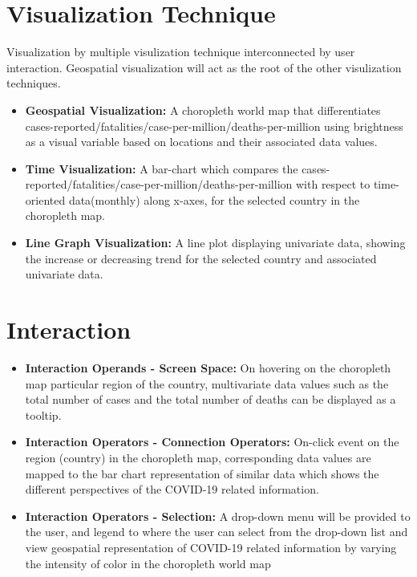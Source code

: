 \documentclass[10pt]{article}
\begin{document}
\section{Visualization Technique}
Visualization by multiple visulization technique interconnected by user interaction. Geospatial visualization will act as the root of the other visulization techniques. 
\begin{itemize}
    \item \textbf{Geospatial Visualization:} A choropleth world map that differentiates cases-reported/fatalities/case-per-million/deaths-per-million using brightness as a visual variable based on locations and their associated data values.
    \item \textbf{Time Visualization:} A bar-chart which compares the cases-reported/fatalities/case-per-million/deaths-per-million with respect to time-oriented data(monthly) along x-axes, for the selected country in the choropleth map. 
     \item \textbf{Line Graph Visualization:} A line plot displaying univariate data, showing the increase or decreasing trend for the selected country and associated univariate data.
\end{itemize}


\section{Interaction}
\begin{itemize}
    \item \textbf{Interaction Operands - Screen Space:} On hovering on the choropleth map particular region of the country,
    multivariate data values such as the total number of cases and the total number of deaths can be displayed as a tooltip.
    \item \textbf{Interaction Operators - Connection Operators:} On-click event on the region (country) in the choropleth map,
    corresponding data values are mapped to the bar chart representation of similar data which shows the different perspectives of the COVID-19 related information.
    \item \textbf{Interaction Operators - Selection:} A drop-down menu will be provided to the user, and legend to 
    where the user can select from the drop-down list and view geospatial representation of COVID-19 related information by varying the intensity of color in the choropleth world map
\end{itemize}
\end{document}
